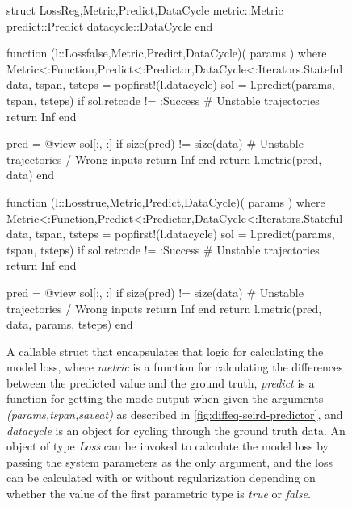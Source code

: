 \begin{figure}[!htb]
\begin{jllisting}
struct Loss{Reg,Metric,Predict,DataCycle}
    metric::Metric
    predict::Predict
    datacycle::DataCycle
end

function (l::Loss{false,Metric,Predict,DataCycle})(
    params
) where {Metric<:Function,Predict<:Predictor,DataCycle<:Iterators.Stateful}
    data, tspan, tsteps = popfirst!(l.datacycle)
    sol = l.predict(params, tspan, tsteps)
    if sol.retcode != :Success
        # Unstable trajectories
        return Inf
    end

    pred = @view sol[:, :]
    if size(pred) != size(data)
        # Unstable trajectories / Wrong inputs
        return Inf
    end
    return l.metric(pred, data)
end

function (l::Loss{true,Metric,Predict,DataCycle})(
    params
) where {Metric<:Function,Predict<:Predictor,DataCycle<:Iterators.Stateful}
    data, tspan, tsteps = popfirst!(l.datacycle)
    sol = l.predict(params, tspan, tsteps)
    if sol.retcode != :Success
        # Unstable trajectories
        return Inf
    end

    pred = @view sol[:, :]
    if size(pred) != size(data)
        # Unstable trajectories / Wrong inputs
        return Inf
    end
    return l.metric(pred, data, params, tsteps)
end
\end{jllisting}
\caption{A callable struct that encapsulates that logic for calculating the model loss, where \textit{metric} is a function for calculating the differences between the predicted value and the ground truth, \textit{predict} is a function for getting the mode output when given the arguments \textit{(params,tspan,saveat)} as described in \autoref{fig:diffeq-seird-predictor}, and \textit{datacycle} is an object for cycling through the ground truth data. An object of type \textit{Loss} can be invoked to calculate the model loss by passing the system parameters as the only argument, and the loss can be calculated with or without regularization depending on whether the value of the first parametric type is \textit{true} or \textit{false}.}
\label{fig:diffeq-seird-loss}
\end{figure}